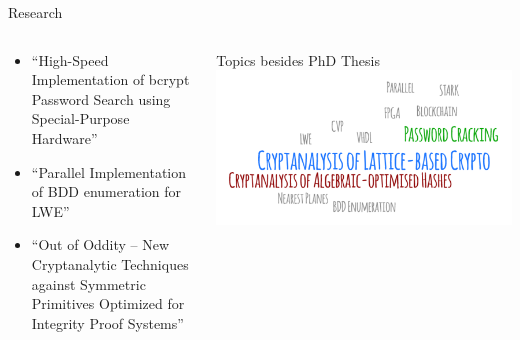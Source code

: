 \documentclass[%
    10pt,
    professionalfont,
    aspectratio=169,
    xcolor=dvipsnames, 
]{beamer}
\begin{document}
\begin{frame}{Research}
    \begin{columns}
        \begin{column}{0.45\textwidth}
            \begin{itemize}
                \item \enquote{High-Speed Implementation of bcrypt Password Search using Special-Purpose Hardware}
                \item \enquote{Parallel Implementation of BDD enumeration for LWE}
                \item \enquote{Out of Oddity -- New Cryptanalytic Techniques against Symmetric Primitives Optimized for Integrity Proof Systems}
            \end{itemize}
        \end{column}
        \begin{column}{0.45\textwidth}
            \begin{block}{Topics besides PhD Thesis}
            \centering
            \includegraphics[width=\textwidth]{data/research-topics.png}
            \end{block}
        \end{column}
    \end{columns}
\end{frame}
\end{document}

